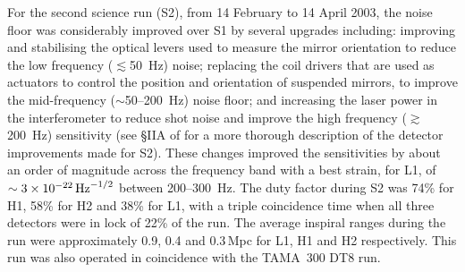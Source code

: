\documentclass{article}
\begin{document}

For the second science run (S2), from 14 February to 14 April 2003, the noise
floor was considerably improved over S1 by several upgrades including:
improving and stabilising the optical levers used to measure the mirror
orientation to reduce the low frequency ($\lesssim$50~Hz) noise; replacing the
coil drivers that are used as actuators to control the position and
orientation of suspended mirrors, to improve the mid-frequency
($\sim$50--200~Hz) noise floor; and increasing the laser power in the
interferometer to reduce shot noise and improve the high frequency
($\gtrsim$200~Hz) sensitivity (see \S{}IIA of \cite{Abbott:2005a} for a more
thorough description of the detector improvements made for S2). These changes
improved the sensitivities by about an order of magnitude across the frequency
band with a best strain, for L1, of $\sim3\times10^{-22}\,{\rm Hz}^{-1/2}$
between 200--300~Hz. The duty factor during S2 was 74\% for H1, 58\% for H2 and
38\% for L1, with a triple coincidence time when all three detectors were in
lock of 22\% of the run. The average inspiral ranges during the run
were approximately 0.9, 0.4 and 0.3\,Mpc for L1, H1 and H2 respectively. This run was also
operated in coincidence with the TAMA~300 DT8 run.
\end{document}
